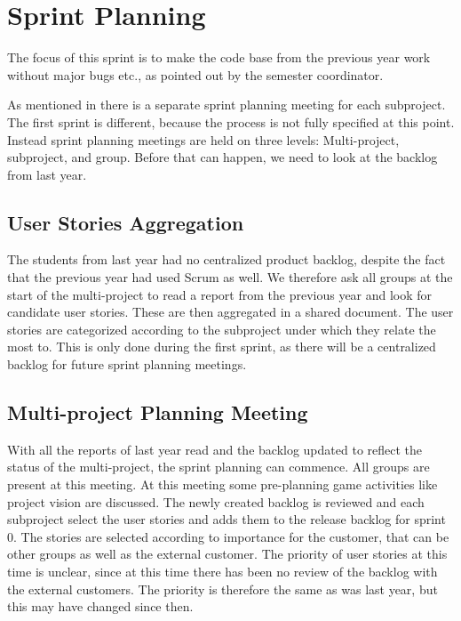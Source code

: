 \chapter{Sprint Planning}\label{chap:sprint1_planning}
The focus of this sprint is to make the code base from the previous year work without major bugs etc., as pointed out by the semester coordinator.

As mentioned in  there is a separate sprint planning meeting for each subproject. The first sprint is different, because the process is not fully specified at this point. Instead sprint planning meetings are held on three levels: Multi-project, subproject, and group. Before that can happen, we need to look at the backlog from last year.

\section{User Stories Aggregation}
The students from last year had no centralized product backlog, despite the fact that the previous year had used Scrum as well. We therefore ask all groups at the start of the multi-project to read a report from the previous year and look for candidate user stories. These are then aggregated in a shared document. The user stories are categorized according to the subproject under which they relate the most to. This is only done during the first sprint, as there will be a centralized backlog for future sprint planning meetings.

\section{Multi-project Planning Meeting}
With all the reports of last year read and the backlog updated to reflect the status of the multi-project, the sprint planning can commence. All groups are present at this meeting. At this meeting some pre-planning game activities like project vision are discussed. The newly created backlog is reviewed and each subproject select the user stories and adds them to the release backlog for sprint 0. The stories are selected according to importance for the customer, that can be other groups as well as the external customer. The priority of user stories at this time is unclear, since at this time there has been no review of the backlog with the external customers. The priority is therefore the same as was last year, but this may have changed since then.

